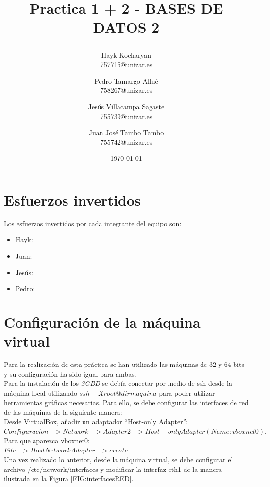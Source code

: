 \documentclass{article}
\begin{document}
\begin{titlepage}
	\title{
		\begin{Huge}
			Practica 1 + 2 - BASES DE DATOS 2
		\end{Huge}
	}
	\author{
	  Hayk Kocharyan\\
	  757715@unizar.es
	  \and
	  Pedro Tamargo Allué\\
	  758267@unizar.es
	  \and
	  Jesús Villacampa Sagaste\\
	  755739@unizar.es
	  \and
	  Juan José Tambo Tambo\\
	  755742@unizar.es
	}
	\date{\today}
	
	\clearpage\maketitle
	\thispagestyle{empty}
	\tableofcontents
	\listoffigures 
	
\end{titlepage}

\newpage 

\section{Esfuerzos invertidos}
Los esfuerzos invertidos por cada integrante del equipo son:
\begin{itemize}
\item Hayk:
\item Juan:
\item Jesús:
\item Pedro: 
\end{itemize}

\section{Configuración de la máquina virtual}
Para la realización de esta práctica se han utilizado las máquinas de 32 y 64 bits y su configuración ha sido igual para ambas.\\

Para la instalación de los \emph{SGBD} se debía conectar por medio de ssh  desde la máquina local utilizando $ssh -X root@dirmaquina$ para poder utilizar herramientas gráficas necesarias. Para ello, se debe configurar las interfaces de red de las máquinas de la siguiente manera:\\
Desde VirtualBox, añadir un adaptador “Host-only Adapter”:\\
$Configuracion->Network->Adapter2->Host-only Adapter (Name: vboxnet0).$
\\
Para que aparezca vboxnet0:\\
$File->Host Network Adapter->create$
\\
Una vez realizado lo anterior, desde la máquina virtual, se debe configurar el archivo /etc/network/interfaces y modificar la interfaz eth1 de la manera ilustrada en la Figura \ref{FIG:interfacesRED}.
\end{document}
